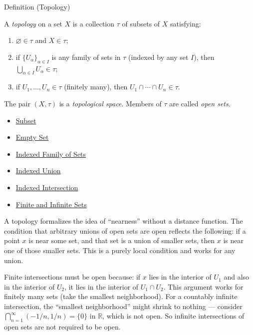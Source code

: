 \begin{definitionbox}{Definition (Topology)}
\begin{definition}[Topology]\label{def:topology-defn}
A \emph{topology} on a set $X$ is a collection $\tau$ of subsets of $X$
satisfying:
\begin{enumerate}[label=(\roman*)]
\item $\varnothing \in \tau$ and $X \in \tau$;
\item if $\{U_\alpha\}_{\alpha \in I}$ is any family of sets in $\tau$ (indexed
  by any set $I$), then $\bigcup_{\alpha \in I} U_\alpha \in \tau$;
\item if $U_1, \dots, U_n \in \tau$ (finitely many), then $U_1 \cap \cdots
  \cap U_n \in \tau$.
\end{enumerate}
The pair $(X, \tau)$ is a \emph{topological space}. Members of $\tau$ are
called \emph{open sets}.
\end{definition}
\end{definitionbox}

\begin{dependencies}
\begin{itemize}
  \item \hyperref[def:subset]{Subset}
  \item \hyperref[def:empty-set]{Empty Set}
  \item \hyperref[def:indexed-family]{Indexed Family of Sets}
  \item \hyperref[def:indexed-union]{Indexed Union}
  \item \hyperref[def:indexed-intersection]{Indexed Intersection}
  \item \hyperref[def:finite-infinite]{Finite and Infinite Sets}
\end{itemize}
\end{dependencies}

\begin{remark*}
A topology formalizes the idea of ``nearness'' without a distance function.
The condition that arbitrary unions of open sets are open reflects the
following: if a point $x$ is near some set, and that set is a union of smaller
sets, then $x$ is near one of those smaller sets. This is a purely local
condition and works for any union.

Finite intersections must be open because: if $x$ lies in the interior of
$U_1$ and also in the interior of $U_2$, it lies in the interior of $U_1 \cap
U_2$. This argument works for finitely many sets (take the smallest
neighborhood). For a countably infinite intersection, the ``smallest
neighborhood'' might shrink to nothing --- consider $\bigcap_{n=1}^\infty
(-1/n, 1/n) = \{0\}$ in $\mathbb{R}$, which is not open. So infinite
intersections of open sets are not required to be open.
\end{remark*}


